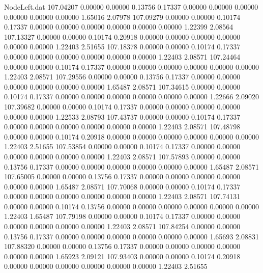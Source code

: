 \begin{filecontents}{NodeLeft.dat}
 107.04207    0.00000    0.00000     0.13756    0.17337    0.00000    0.00000    0.00000    0.00000    0.00000    0.00000    1.65016    2.07978
 107.09279    0.00000    0.00000     0.10174    0.17337    0.00000    0.00000    0.00000    0.00000    0.00000    0.00000    1.22399    2.08564
 107.13327    0.00000    0.00000     0.10174    0.20918    0.00000    0.00000    0.00000    0.00000    0.00000    0.00000    1.22403    2.51655
 107.18378    0.00000    0.00000     0.10174    0.17337    0.00000    0.00000    0.00000    0.00000    0.00000    0.00000    1.22403    2.08571
 107.24464    0.00000    0.00000     0.10174    0.17337    0.00000    0.00000    0.00000    0.00000    0.00000    0.00000    1.22403    2.08571
 107.29556    0.00000    0.00000     0.13756    0.17337    0.00000    0.00000    0.00000    0.00000    0.00000    0.00000    1.65487    2.08571
 107.34615    0.00000    0.00000     0.10174    0.17337    0.00000    0.00000    0.00000    0.00000    0.00000    0.00000    1.22666    2.09020
 107.39682    0.00000    0.00000     0.10174    0.17337    0.00000    0.00000    0.00000    0.00000    0.00000    0.00000    1.22533    2.08793
 107.43737    0.00000    0.00000     0.10174    0.17337    0.00000    0.00000    0.00000    0.00000    0.00000    0.00000    1.22403    2.08571
 107.48798    0.00000    0.00000     0.10174    0.20918    0.00000    0.00000    0.00000    0.00000    0.00000    0.00000    1.22403    2.51655
 107.53854    0.00000    0.00000     0.10174    0.17337    0.00000    0.00000    0.00000    0.00000    0.00000    0.00000    1.22403    2.08571
 107.57893    0.00000    0.00000     0.13756    0.17337    0.00000    0.00000    0.00000    0.00000    0.00000    0.00000    1.65487    2.08571
 107.65005    0.00000    0.00000     0.13756    0.17337    0.00000    0.00000    0.00000    0.00000    0.00000    0.00000    1.65487    2.08571
 107.70068    0.00000    0.00000     0.10174    0.17337    0.00000    0.00000    0.00000    0.00000    0.00000    0.00000    1.22403    2.08571
 107.74131    0.00000    0.00000     0.10174    0.13756    0.00000    0.00000    0.00000    0.00000    0.00000    0.00000    1.22403    1.65487
 107.79198    0.00000    0.00000     0.10174    0.17337    0.00000    0.00000    0.00000    0.00000    0.00000    0.00000    1.22403    2.08571
 107.84254    0.00000    0.00000     0.13756    0.17337    0.00000    0.00000    0.00000    0.00000    0.00000    0.00000    1.65693    2.08831
 107.88320    0.00000    0.00000     0.13756    0.17337    0.00000    0.00000    0.00000    0.00000    0.00000    0.00000    1.65923    2.09121
 107.93403    0.00000    0.00000     0.10174    0.20918    0.00000    0.00000    0.00000    0.00000    0.00000    0.00000    1.22403    2.51655

\end{filecontents}
